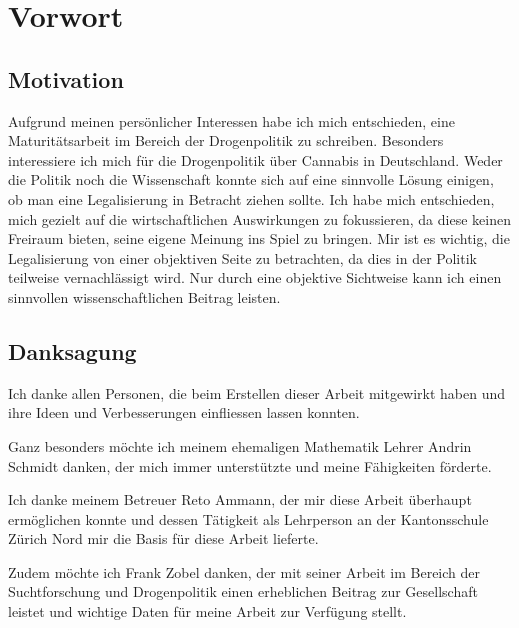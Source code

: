 \documentclass[../main.tex]{subfiles}
\begin{document}
	\section*{Vorwort}	
	
	\subsection*{Motivation}
	Aufgrund meinen persönlicher Interessen habe ich mich entschieden, eine Maturitätsarbeit im Bereich der Drogenpolitik zu schreiben. 
	Besonders interessiere ich mich für die Drogenpolitik über Cannabis in Deutschland.
	Weder die Politik noch die Wissenschaft konnte sich auf eine sinnvolle Lösung einigen, ob man eine Legalisierung in Betracht ziehen sollte.
	Ich habe mich entschieden, mich gezielt auf die wirtschaftlichen Auswirkungen zu fokussieren, da diese keinen Freiraum bieten, seine eigene Meinung ins Spiel zu bringen.
	Mir ist es wichtig, die Legalisierung von einer objektiven Seite zu betrachten, da dies in der Politik teilweise vernachlässigt wird.
	Nur durch eine objektive Sichtweise kann ich einen sinnvollen wissenschaftlichen Beitrag leisten.
	
	
	\subsection*{Danksagung}
	Ich danke allen Personen, die beim Erstellen dieser Arbeit mitgewirkt haben und ihre Ideen und Verbesserungen einfliessen lassen konnten.
	
	\noindent
	Ganz besonders möchte ich meinem ehemaligen Mathematik Lehrer Andrin Schmidt danken, der mich immer unterstützte und meine Fähigkeiten förderte.
	
	\noindent
	Ich danke meinem Betreuer Reto Ammann, der mir diese Arbeit überhaupt ermöglichen konnte und dessen Tätigkeit als Lehrperson an der Kantonsschule Zürich Nord mir die Basis für diese Arbeit lieferte.
	
	\noindent
	Zudem möchte ich Frank Zobel danken, der mit seiner Arbeit im Bereich der Suchtforschung und Drogenpolitik einen erheblichen Beitrag zur Gesellschaft leistet und wichtige Daten für meine Arbeit zur Verfügung stellt.
	
\end{document}
